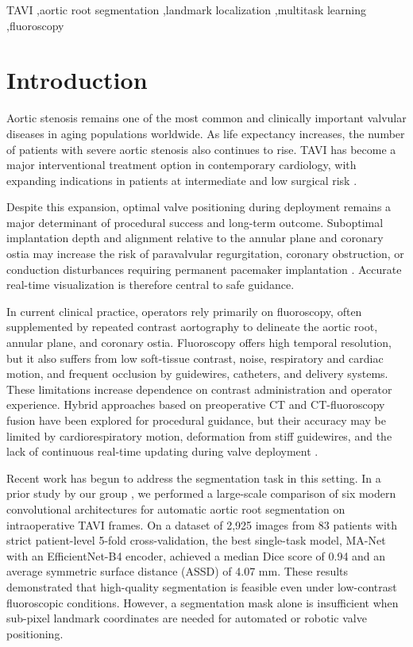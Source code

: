 \documentclass[preprint,12pt,authoryear]{elsarticle}
\begin{document}
\begin{frontmatter}
\begin{keyword}
TAVI \sep aortic root segmentation \sep landmark localization \sep multitask learning \sep fluoroscopy
\end{keyword}

\end{frontmatter}

\section{Introduction}

Aortic stenosis remains one of the most common and clinically important valvular diseases in aging populations worldwide. As life expectancy increases, the number of patients with severe aortic stenosis also continues to rise. TAVI has become a major interventional treatment option in contemporary cardiology, with expanding indications in patients at intermediate and low surgical risk \citep{otto2020_guideline,vahanian2021_guidelines,leon2019_partner3}.

Despite this expansion, optimal valve positioning during deployment remains a major determinant of procedural success and long-term outcome. Suboptimal implantation depth and alignment relative to the annular plane and coronary ostia may increase the risk of paravalvular regurgitation, coronary obstruction, or conduction disturbances requiring permanent pacemaker implantation \citep{pibarot2021_pvl,jilaihawi2022_coronary,kammler2016_implantdepth}. Accurate real-time visualization is therefore central to safe guidance.

In current clinical practice, operators rely primarily on fluoroscopy, often supplemented by repeated contrast aortography to delineate the aortic root, annular plane, and coronary ostia. Fluoroscopy offers high temporal resolution, but it also suffers from low soft-tissue contrast, noise, respiratory and cardiac motion, and frequent occlusion by guidewires, catheters, and delivery systems. These limitations increase dependence on contrast administration and operator experience. Hybrid approaches based on preoperative CT and CT-fluoroscopy fusion have been explored for procedural guidance, but their accuracy may be limited by cardiorespiratory motion, deformation from stiff guidewires, and the lack of continuous real-time updating during valve deployment \citep{vernikouskaya2017_imageguidance,vernikouskaya2018_registration}.

Recent work has begun to address the segmentation task in this setting. In a prior study by our group \citep{laptev2025_aorticroot}, we performed a large-scale comparison of six modern convolutional architectures for automatic aortic root segmentation on intraoperative TAVI frames. On a dataset of 2,925 images from 83 patients with strict patient-level 5-fold cross-validation, the best single-task model, MA-Net with an EfficientNet-B4 encoder, achieved a median Dice score of 0.94 and an average symmetric surface distance (ASSD) of 4.07 mm. These results demonstrated that high-quality segmentation is feasible even under low-contrast fluoroscopic conditions. However, a segmentation mask alone is insufficient when sub-pixel landmark coordinates are needed for automated or robotic valve positioning.
\end{document}
